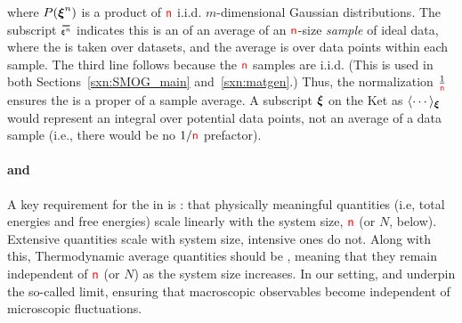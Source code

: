 where $P(\boldsymbol{\xi}^{n})$ is a product of ${\color{red}\sf{n}}$ i.i.d. $m$-dimensional Gaussian distributions.
The subscript $\AVGNDXIn$ indicates this is an
\ExpectedValue of an average of an ${\color{red}\sf{n}}$-size \emph{sample} of ideal data, where the \ExpectedValue is taken over datasets, and the average is over data points within each sample. The third line follows because the ${\color{red}\sf{n}}$ samples are i.i.d.
(This is used in both Sections~\ref{sxn:SMOG_main} and~\ref{sxn:matgen}.)
Thus, the  normalization $\tfrac{1}{{\color{red}\sf{n}}}$ ensures the \BraKet is a proper \ExpectedValue of a sample average.
A subscript $\boldsymbol{\xi}$ on the Ket as $\langle\cdots\rangle_{\boldsymbol{\xi}}$ would represent an integral over potential data points, not an average of a data sample (i.e., there would be no $1/{\color{red}\sf{n}}$ prefactor).
%

\paragraph{\SizeExtensivity and \SizeIntensivity}
A key requirement for the \ThermodynamicLimit in \STATMECH is \emph{\SizeExtensivity}:
that physically meaningful quantities (i.e, total energies and free energies)
scale linearly with the system size, ${\color{red}\sf{n}}$ (or $N$, below).
Extensive quantities scale with system size, intensive ones do not.
Along with this, Thermodynamic average quantities should be \emph{\SizeIntensive},
meaning that they remain independent of ${\color{red}\sf{n}}$ (or $N$) as the system size increases.
In our setting, \SizeExtensivity and \SizeIntensivity underpin the so-called \LargeN limit,
ensuring that macroscopic observables become independent of
microscopic fluctuations.

